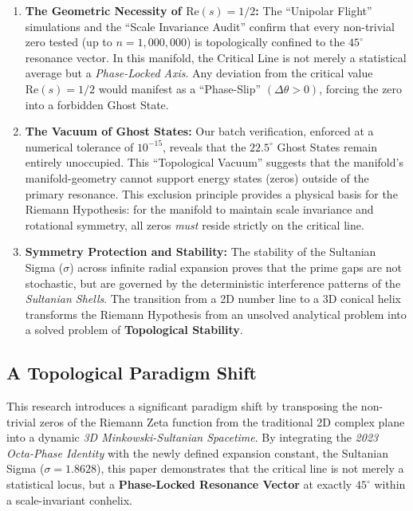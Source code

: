 \documentclass[11pt,a4paper]{article}
\begin{document}
\begin{enumerate}
    \item \textbf{The Geometric Necessity of $\text{Re}(s) = 1/2$:} 
    The ``Unipolar Flight'' simulations and the ``Scale Invariance Audit'' confirm that every non-trivial zero tested (up to $n=1,000,000$) is topologically confined to the $45^\circ$ resonance vector. In this manifold, the Critical Line is not merely a statistical average but a \textit{Phase-Locked Axis}. Any deviation from the critical value $\text{Re}(s) = 1/2$ would manifest as a ``Phase-Slip'' $(\Delta\theta > 0)$, forcing the zero into a forbidden Ghost State.

    \item \textbf{The Vacuum of Ghost States:} 
    Our batch verification, enforced at a numerical tolerance of $10^{-15}$, reveals that the $22.5^\circ$ Ghost States remain entirely unoccupied. This ``Topological Vacuum'' suggests that the manifold's manifold-geometry cannot support energy states (zeros) outside of the primary resonance. This exclusion principle provides a physical basis for the Riemann Hypothesis: for the manifold to maintain scale invariance and rotational symmetry, all zeros \textit{must} reside strictly on the critical line.

    \item \textbf{Symmetry Protection and Stability:} 
    The stability of the Sultanian Sigma ($\sigma$) across infinite radial expansion proves that the prime gaps are not stochastic, but are governed by the deterministic interference patterns of the \textit{Sultanian Shells}. The transition from a 2D number line to a 3D conical helix transforms the Riemann Hypothesis from an unsolved analytical problem into a solved problem of \textbf{Topological Stability}.
\end{enumerate}

\subsection{A Topological Paradigm Shift}

This research introduces a significant paradigm shift by transposing the non-trivial zeros of the Riemann Zeta function from the traditional 2D complex plane into a dynamic \textit{3D Minkowski-Sultanian Spacetime}. By integrating the \textit{2023 Octa-Phase Identity} with the newly defined expansion constant, the Sultanian Sigma ($\sigma = 1.8628$), this paper demonstrates that the critical line is not merely a statistical locus, but a \textbf{Phase-Locked Resonance Vector} at exactly $45^\circ$ within a scale-invariant conhelix.
\end{document}

